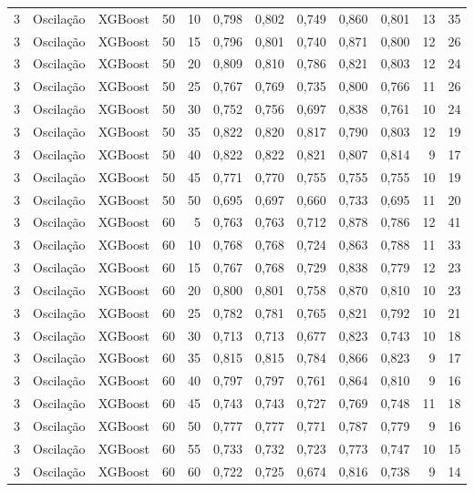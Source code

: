 \begin{longtable}{@{}rllrrrrrrrrr@{}}
3 & Oscilação & XGBoost & 50 & 10 & 0,798 & 0,802 & 0,749 & 0,860 & 0,801 & 13 & 35 \\
3 & Oscilação & XGBoost & 50 & 15 & 0,796 & 0,801 & 0,740 & 0,871 & 0,800 & 12 & 26 \\
3 & Oscilação & XGBoost & 50 & 20 & 0,809 & 0,810 & 0,786 & 0,821 & 0,803 & 12 & 24 \\
3 & Oscilação & XGBoost & 50 & 25 & 0,767 & 0,769 & 0,735 & 0,800 & 0,766 & 11 & 26 \\
3 & Oscilação & XGBoost & 50 & 30 & 0,752 & 0,756 & 0,697 & 0,838 & 0,761 & 10 & 24 \\
3 & Oscilação & XGBoost & 50 & 35 & 0,822 & 0,820 & 0,817 & 0,790 & 0,803 & 12 & 19 \\
3 & Oscilação & XGBoost & 50 & 40 & 0,822 & 0,822 & 0,821 & 0,807 & 0,814 & 9 & 17 \\
3 & Oscilação & XGBoost & 50 & 45 & 0,771 & 0,770 & 0,755 & 0,755 & 0,755 & 10 & 19 \\
3 & Oscilação & XGBoost & 50 & 50 & 0,695 & 0,697 & 0,660 & 0,733 & 0,695 & 11 & 20 \\
3 & Oscilação & XGBoost & 60 & 5 & 0,763 & 0,763 & 0,712 & 0,878 & 0,786 & 12 & 41 \\
3 & Oscilação & XGBoost & 60 & 10 & 0,768 & 0,768 & 0,724 & 0,863 & 0,788 & 11 & 33 \\
3 & Oscilação & XGBoost & 60 & 15 & 0,767 & 0,768 & 0,729 & 0,838 & 0,779 & 12 & 23 \\
3 & Oscilação & XGBoost & 60 & 20 & 0,800 & 0,801 & 0,758 & 0,870 & 0,810 & 10 & 23 \\
3 & Oscilação & XGBoost & 60 & 25 & 0,782 & 0,781 & 0,765 & 0,821 & 0,792 & 10 & 21 \\
3 & Oscilação & XGBoost & 60 & 30 & 0,713 & 0,713 & 0,677 & 0,823 & 0,743 & 10 & 18 \\
3 & Oscilação & XGBoost & 60 & 35 & 0,815 & 0,815 & 0,784 & 0,866 & 0,823 & 9 & 17 \\
3 & Oscilação & XGBoost & 60 & 40 & 0,797 & 0,797 & 0,761 & 0,864 & 0,810 & 9 & 16 \\
3 & Oscilação & XGBoost & 60 & 45 & 0,743 & 0,743 & 0,727 & 0,769 & 0,748 & 11 & 18 \\
3 & Oscilação & XGBoost & 60 & 50 & 0,777 & 0,777 & 0,771 & 0,787 & 0,779 & 9 & 16 \\
3 & Oscilação & XGBoost & 60 & 55 & 0,733 & 0,732 & 0,723 & 0,773 & 0,747 & 10 & 15 \\
3 & Oscilação & XGBoost & 60 & 60 & 0,722 & 0,725 & 0,674 & 0,816 & 0,738 & 9 & 14 \\

\end{longtable}
